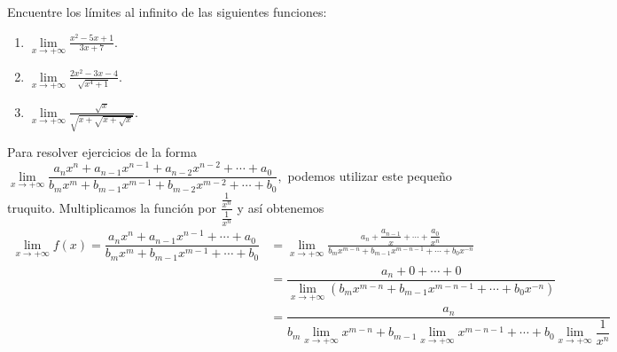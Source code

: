 \begin{exercise}
	Encuentre los l\'imites al infinito de las siguientes funciones:
	\begin{enumerate}
		\item \(\lim\limits_{x\to+\infty}\frac{x^2-5x+1}{3x+7}.\)
		\item \(\lim\limits_{x\to+\infty}\frac{2x^2-3x-4}{\sqrt{x^4+1}}.\)
		\item \(\lim\limits_{x\to+\infty}\frac{\sqrt{x}}{\sqrt{x+\sqrt{x+\sqrt{x}}}}. \)
	\end{enumerate}
\end{exercise}
Para resolver ejercicios de la forma \(\lim\limits_{x\to+\infty}\dfrac{a_nx^n+a_{n-1}x^{n-1}+a_{n-2}x^{n-2}+\cdots+a_0}{b_mx^m+b_{m-1}x^{m-1}+b_{m-2}x^{m-2}+\cdots+b_0},\) podemos utilizar este peque\~no truquito. Multiplicamos la funci\'on por \(\dfrac{\frac{1}{x^n}}{\frac{1}{x^n}}\) y as\'i obtenemos
\begin{align*}
\lim\limits_{x\to+\infty}f(x)=\dfrac{a_nx^n+a_{n-1}x^{n-1}+\cdots+a_0}{b_mx^m+b_{m-1}x^{m-1}+\cdots+b_0}&=\lim\limits_{x\to+\infty}\frac{a_n+\dfrac{a_{n-1}}{x}+\cdots+\dfrac{a_0}{x^n}}{b_mx^{m-n}+b_{m-1}x^{m-n-1}+\cdots+b_0x^{-n} }\\
&=\dfrac{a_n+0+\cdots+0}{\lim\limits_{x\to+\infty}\left(b_mx^{m-n}+b_{m-1}x^{m-n-1}+\cdots+b_0x^{-n}\right)}\\
&=\dfrac{a_n}{b_m\lim\limits_{x\to+\infty}x^{m-n}+b_{m-1}\lim\limits_{x\to+\infty}x^{m-n-1}+\cdots+b_0\lim\limits_{x\to+\infty}\dfrac{1}{x^n}}
\end{align*}
